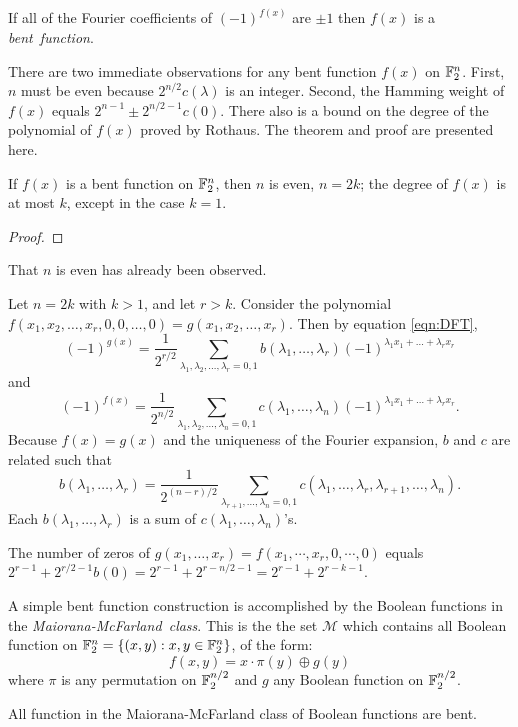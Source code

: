 \begin{definition}\label{def:bent-function}
  If all of the Fourier coefficients of $(-1)^{f(x)}$ are $\pm1$ then
  $f(x)$ is a {\em bent\ function}.
\end{definition}

\par There are two immediate observations for any bent function $f(x)$ on $\mathbb{F}_2^n$.
First, $n$ must be even because $2^{n/2}c(\lambda)$ is an integer. Second, the Hamming
weight of $f(x)$ equals $2^{n-1}\pm2^{n/2-1}c(0)$. There also is a bound on the degree
of the polynomial of $f(x)$ proved by Rothaus. The theorem and proof are presented here.

\begin{theorem}\label{thm:deg-of-bent-function}
	If $f(x)$ is a bent function on $\mathbb{F}_2^n$, then $n$ is even, $n=2k$;
	the degree of $f(x)$ is at most $k$, except in the case $k=1$.
\end{theorem}
\begin{proof}
\end{proof}
\par That $n$ is even has already been observed.
\par Let $n=2k$ with $k>1$, and let $r>k$. Consider the polynomial
$f(x_1,x_2,\dots,x_r,0,0,\dots,0)=g(x_1,x_2,\dots,x_r)$. Then by equation \ref{eqn:DFT},
\[
	(-1)^{g(x)}=\frac{1}{2^{r/2}}\sum_{\lambda_1,\lambda_2,\dots,\lambda_r=0,1}b(\lambda_1,\dots,\lambda_r)(-1)^{\lambda_1x_1+\dots+\lambda_rx_r}
\]
and
\[
	(-1)^{f(x)}=\frac{1}{2^{n/2}}\sum_{\lambda_1,\lambda_2,\dots,\lambda_n=0,1}c(\lambda_1,\dots,\lambda_n)(-1)^{\lambda_1x_1+\dots+\lambda_rx_r}.
\]
Because $f(x)=g(x)$ and the uniqueness of the Fourier expansion, $b$ and $c$ are related such that
\[
b(\lambda_1,\dots,\lambda_r)=\frac{1}{2^{(n-r)/2}}\sum_{\lambda_{r+1},\dots,\lambda_n=0,1}c(\lambda_1,\dots,\lambda_r,\lambda_{r+1},\dots,\lambda_n).
\]
Each $b(\lambda_1,\dots,\lambda_r)$ is a sum of $c(\lambda_1,\dots,\lambda_n)$'s.
\par The number of zeros of $g(x_1,\dots,x_r)=f(x_1,\cdots,x_r,0,\cdots,0)$
equals $2^{r-1}+2^{r/2-1}b(0)=2^{r-1}+2^{r-n/2-1}=2^{r-1}+2^{r-k-1}$.


\par A simple bent function construction is accomplished by the Boolean functions
in the {\em Maiorana-McFarland\ class}. This is the the set $\mathcal{M}$ which
contains all Boolean function on $\mathbb{F}_2^n=\{(x,y):x,y\in\mathbb{F}_2^n\}$, of the form:
  \[
  f(x,y)=x\cdot\pi(y)\oplus g(y)
  \]
where $\pi$ is any permutation on $\mathbb{F}_2^{n/2}$ and $g$ any Boolean function on
$\mathbb{F}_2^{n/2}$.

\par All function in the Maiorana-McFarland class of Boolean functions are bent.
